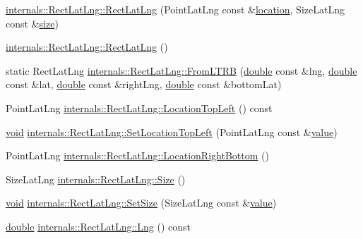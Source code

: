 \begin{DoxyCompactItemize}
\item 
\hyperlink{group___o_p_map_widget_gab62bfb97bab6213f9a6159d2f1c75d5d}{internals\-::\-Rect\-Lat\-Lng\-::\-Rect\-Lat\-Lng} (Point\-Lat\-Lng const \&\hyperlink{glext_8h_a6f0165ed903f22b8bb600c3e0b628e73}{location}, Size\-Lat\-Lng const \&\hyperlink{glext_8h_a014d89bd76f74ef3a29c8f04b473eb76}{size})
\item 
\hyperlink{group___o_p_map_widget_ga512c376dfebb298e064a143c262ac18f}{internals\-::\-Rect\-Lat\-Lng\-::\-Rect\-Lat\-Lng} ()
\item 
static Rect\-Lat\-Lng \hyperlink{group___o_p_map_widget_gaaf71d43bd87065c51a98a46717d581a6}{internals\-::\-Rect\-Lat\-Lng\-::\-From\-L\-T\-R\-B} (\hyperlink{_super_l_u_support_8h_a8956b2b9f49bf918deed98379d159ca7}{double} const \&lng, \hyperlink{_super_l_u_support_8h_a8956b2b9f49bf918deed98379d159ca7}{double} const \&lat, \hyperlink{_super_l_u_support_8h_a8956b2b9f49bf918deed98379d159ca7}{double} const \&right\-Lng, \hyperlink{_super_l_u_support_8h_a8956b2b9f49bf918deed98379d159ca7}{double} const \&bottom\-Lat)
\item 
Point\-Lat\-Lng \hyperlink{group___o_p_map_widget_gaed234223ec4033a1e269d271d032c9fa}{internals\-::\-Rect\-Lat\-Lng\-::\-Location\-Top\-Left} () const 
\item 
\hyperlink{group___u_a_v_objects_plugin_ga444cf2ff3f0ecbe028adce838d373f5c}{void} \hyperlink{group___o_p_map_widget_gabe9e8daac2f01196b738c5590fe23b94}{internals\-::\-Rect\-Lat\-Lng\-::\-Set\-Location\-Top\-Left} (Point\-Lat\-Lng const \&\hyperlink{glext_8h_aa0e2e9cea7f208d28acda0480144beb0}{value})
\item 
Point\-Lat\-Lng \hyperlink{group___o_p_map_widget_gaa5faf64c8706dfbe274d2265f0d017ae}{internals\-::\-Rect\-Lat\-Lng\-::\-Location\-Right\-Bottom} ()
\item 
Size\-Lat\-Lng \hyperlink{group___o_p_map_widget_ga9e982e2f84c0c4faf6fb0a09d57dc18b}{internals\-::\-Rect\-Lat\-Lng\-::\-Size} ()
\item 
\hyperlink{group___u_a_v_objects_plugin_ga444cf2ff3f0ecbe028adce838d373f5c}{void} \hyperlink{group___o_p_map_widget_ga00d3530356a06affd5c53a39b5247030}{internals\-::\-Rect\-Lat\-Lng\-::\-Set\-Size} (Size\-Lat\-Lng const \&\hyperlink{glext_8h_aa0e2e9cea7f208d28acda0480144beb0}{value})
\item 
\hyperlink{_super_l_u_support_8h_a8956b2b9f49bf918deed98379d159ca7}{double} \hyperlink{group___o_p_map_widget_gae863985fa4b32d0a6f3d044068f2f35c}{internals\-::\-Rect\-Lat\-Lng\-::\-Lng} () const 
\item 

\end{DoxyCompactItemize}
